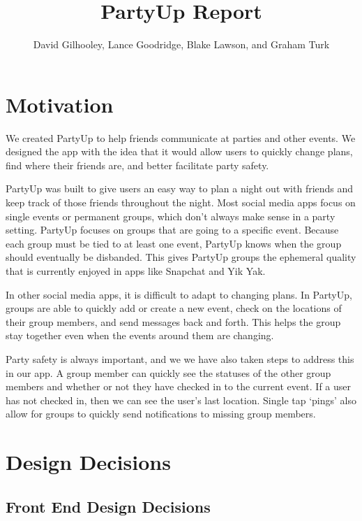 \documentclass[12pt]{article}
\title{PartyUp Report}
\author{David Gilhooley, Lance Goodridge, Blake Lawson, and Graham Turk}
\begin{document}
\pagestyle{plain}

\maketitle

\section{Motivation} %
\label{sec:Motivation}
We created PartyUp to help friends communicate at parties and other events.
We designed the app with the idea that it would allow users to quickly change plans, find where their friends are, and better facilitate party safety.

PartyUp was built to give users an easy way to plan a night out with friends and keep track of those friends throughout the night.
Most social media apps focus on single events or permanent groups, which don't always make sense in a party setting.
PartyUp focuses on groups that are going to a specific event.
Because each group must be tied to at least one event, PartyUp knows when the group should eventually be disbanded.
This gives PartyUp groups the ephemeral quality that is currently enjoyed in apps like Snapchat and Yik Yak.

In other social media apps, it is difficult to adapt to changing plans.
In PartyUp, groups are able to quickly add or create a new event, check on the locations of their group members, and send messages back and forth. This helps the group stay together even when the events around them are changing. 

Party safety is always important, and we we have also taken steps to address this in our app. A group member can quickly see the statuses of the other group members and whether or not they have checked in to the current event.
If a user has not checked in, then we can see the user's last location.
Single tap `pings' also allow for groups to quickly send notifications to missing group members.

\section{Design Decisions} %
\label{sec:design_decisions}


\subsection{Front End Design Decisions}
\end{document}
